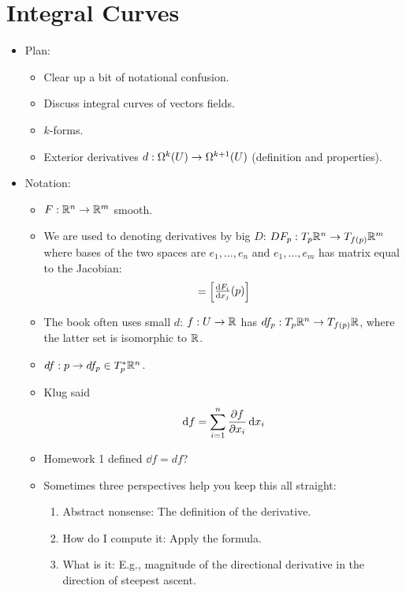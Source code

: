 \documentclass[../notes.tex]{subfiles}
\begin{document}
\section{Integral Curves}
\begin{itemize}
    \item {}Plan:
    \begin{itemize}
        \item Clear up a bit of notational confusion.
        \item Discuss integral curves of vectors fields.
        \item $k$-forms.
        \item Exterior derivatives $d:\ome[k]{U}\to\ome[k+1]{U}$ (definition and properties).
    \end{itemize}
    \item Notation:
    \begin{itemize}
        \item $F:\R^n\to\R^m$ smooth.
        \item We are used to denoting derivatives by big $D$: $DF_p:T_p\R^n\to T_{f(p)}\R^m$ where bases of the two spaces are $e_1,\dots,e_n$ and $e_1,\dots,e_m$ has matrix equal to the Jacobian:
        \begin{equation*}
            [DF_p] =
            \begin{bmatrix}
                {\dv{F_i}{x_j}}(p)
            \end{bmatrix}
        \end{equation*}
        \item The book often uses small $d$: $f:U\to\R$ has $df_p:T_p\R^n\to T_{f(p)}\R$, where the latter set is isomorphic to $\R$.
        \item $df:p\to df_p\in T_p^*\R^n$.
        \item Klug said
        \begin{equation*}
            \dd{f} = \sum_{i=1}^n\pdv{f}{x_i}\dd{x_i}
        \end{equation*}
        \item Homework 1 defined $\dd{f}=df$?
        \item Sometimes three perspectives help you keep this all straight:
        \begin{enumerate}
            \item Abstract nonsense: The definition of the derivative.
            \item How do I compute it: Apply the formula.
            \item What is it: E.g., magnitude of the directional derivative in the direction of steepest ascent.

\end{enumerate}
\end{itemize}
\end{itemize}
\end{document}
